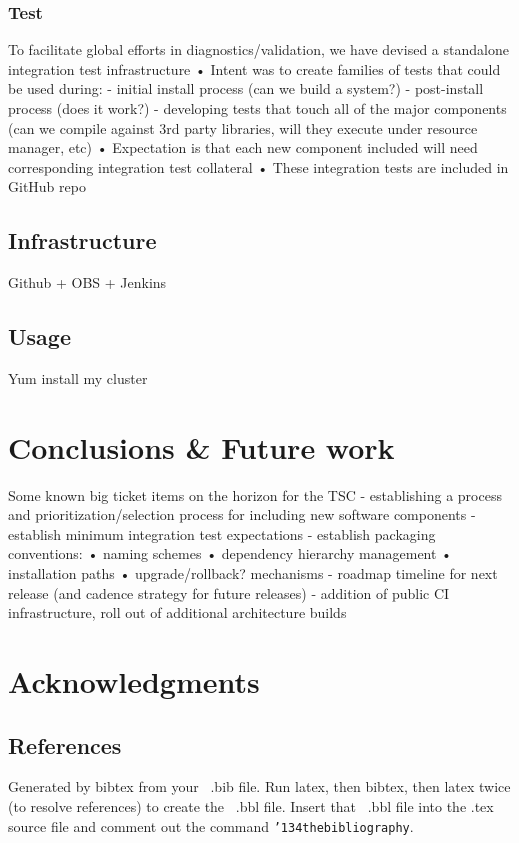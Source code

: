 \documentclass{sig-alternate-05-2015}
\begin{document}
\subsubsection{Test}
 To facilitate global efforts in diagnostics/validation, we have devised a standalone integration test infrastructure
 • Intent was to create families of tests that could be used during:
 - initial install process (can we build a system?)
 - post-install process (does it work?)
 - developing tests that touch all of the major components (can we compile against 3rd party libraries, will they execute under resource manager, etc)
 • Expectation is that each new component included will need corresponding integration test collateral
 • These integration tests are included in GitHub repo



\subsection{Infrastructure}
Github + OBS + Jenkins

\subsection{Usage}
Yum install my cluster

\section{Conclusions \& Future work}
Some known big ticket items on the horizon for the TSC
- establishing a process and prioritization/selection process for including
new software components
- establish minimum integration test expectations
- establish packaging conventions:
• naming schemes
• dependency hierarchy management • installation paths
• upgrade/rollback? mechanisms
- roadmap timeline for next release (and cadence strategy for future releases)
- addition of public CI infrastructure, roll out of additional architecture builds

\section{Acknowledgments}

%

%
%
\subsection{References}
Generated by bibtex from your ~.bib file.  Run latex,
then bibtex, then latex twice (to resolve references)
to create the ~.bbl file.  Insert that ~.bbl file into
the .tex source file and comment out
the command \texttt{{\char'134}thebibliography}.
\end{document}
